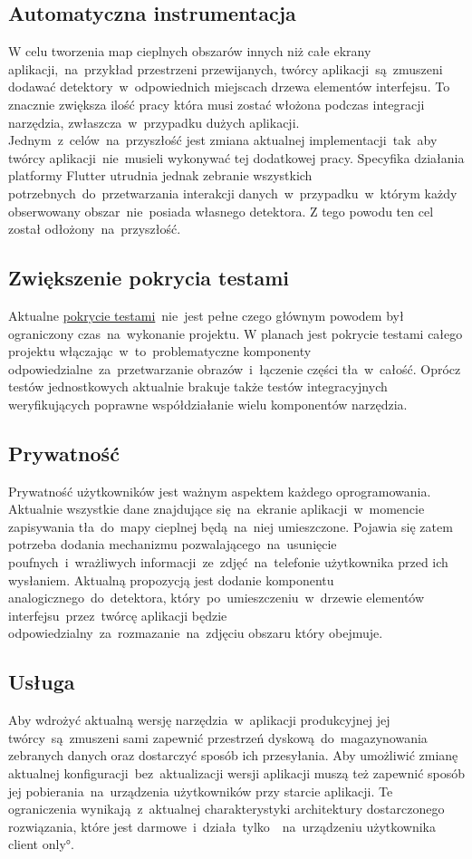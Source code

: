 \subsection{Automatyczna instrumentacja}
\label{sec:auto_instrumentation}
W celu tworzenia map cieplnych obszarów innych niż całe ekrany aplikacji,~na~przykład przestrzeni przewijanych, twórcy aplikacji~są~zmuszeni dodawać detektory~w~odpowiednich miejscach drzewa elementów interfejsu. To znacznie zwiększa ilość pracy która musi zostać włożona podczas integracji narzędzia, zwłaszcza~w~przypadku dużych aplikacji. Jednym~z~celów~na~przyszłość jest zmiana aktualnej implementacji~tak~aby twórcy aplikacji~nie~musieli wykonywać tej dodatkowej pracy. Specyfika działania platformy Flutter utrudnia jednak zebranie wszystkich potrzebnych~do~przetwarzania interakcji danych~w~przypadku~w~którym każdy obserwowany obszar~nie~posiada własnego detektora. Z tego powodu ten cel został odłożony~na~przyszłość.

\subsection{Zwiększenie pokrycia testami}
\label{sec:future_coverage}
Aktualne \hyperref[par:test_coverage]{pokrycie testami}~nie~jest pełne czego głównym powodem był ograniczony czas~na~wykonanie projektu. W planach jest pokrycie testami całego projektu włączając~w~to~problematyczne komponenty odpowiedzialne~za~przetwarzanie obrazów~i~łączenie części tła~w~całość. Oprócz testów jednostkowych aktualnie brakuje także testów integracyjnych weryfikujących poprawne współdziałanie wielu komponentów narzędzia.

\subsection{Prywatność}
Prywatność użytkowników jest ważnym aspektem każdego oprogramowania. Aktualnie wszystkie dane znajdujące się~na~ekranie aplikacji~w~momencie zapisywania tła~do~mapy cieplnej będą~na~niej umieszczone. Pojawia się zatem potrzeba dodania mechanizmu pozwalającego~na~usunięcie poufnych~i~wrażliwych informacji~ze~zdjęć~na~telefonie użytkownika przed ich wysłaniem. Aktualną propozycją jest dodanie komponentu analogicznego~do~detektora, który~po~umieszczeniu~w~drzewie elementów interfejsu~przez~twórcę aplikacji będzie odpowiedzialny~za~rozmazanie~na~zdjęciu obszaru który obejmuje.

\subsection{Usługa}
Aby wdrożyć aktualną wersję narzędzia~w~aplikacji produkcyjnej jej twórcy~są~zmuszeni sami zapewnić przestrzeń dyskową~do~magazynowania zebranych danych oraz dostarczyć sposób ich przesyłania. Aby umożliwić zmianę aktualnej konfiguracji~bez~aktualizacji wersji aplikacji muszą też zapewnić sposób jej pobierania~na~urządzenia użytkowników przy starcie aplikacji. Te ograniczenia wynikają~z~aktualnej charakterystyki architektury dostarczonego rozwiązania, które jest darmowe~i~działa~tylko~~na~urządzeniu użytkownika \ang{client only}.

